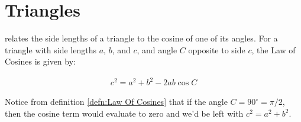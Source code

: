 \section{Triangles}


\begin{defn}{1}
 relates the side lengths of a triangle to the cosine of one of its angles. For a triangle with side lengths $a$, $b$, and $c$, and angle $C$ opposite to side $c$, the Law of Cosines is given by:
\begin{center}
\begin{minipage}{0.3\linewidth}
\end{minipage}
\begin{minipage}{0.4\linewidth}
	\begin{align}
		c^2 = a^2 + b^2 - 2ab\cos C
	\end{align}
\end{minipage}
\end{center}
\end{defn}

Notice from definition \ref{defn:Law Of Cosines} that if the angle $C = 90^\circ = \pi/2$, then the cosine term would evaluate to zero and we'd be left with  $c^2 = a^2 + b^2$.
